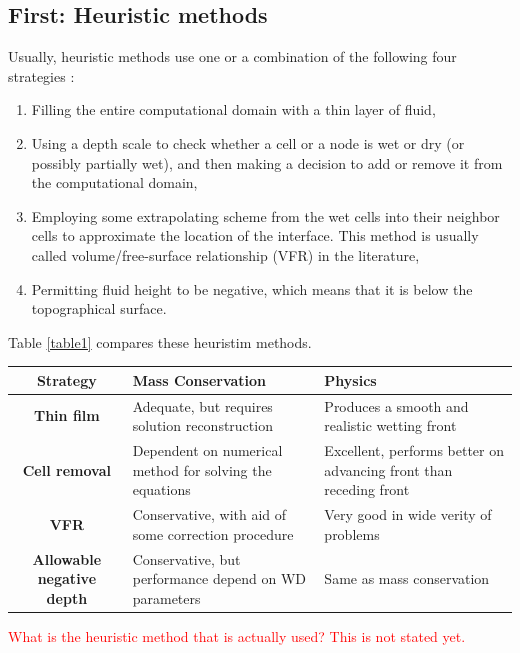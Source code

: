 \documentclass[letterpaper,10pt]{article}
\newcommand{\red}[1]{\textcolor{red}{#1}}
\begin{document}
\subsection{First: Heuristic methods} \label{Heuristic}
Usually, heuristic methods use one or a combination of the following four strategies \cite{Medeiros2013}: 
\begin{enumerate}
        \item Filling the entire computational domain with a thin layer of fluid,
        \item Using a depth scale to check whether a cell or a node is wet or dry 
         (or possibly partially wet), and then  making a decision to add or remove it 
         from the computational domain,
        \item Employing some extrapolating scheme from the wet cells into their neighbor 
         cells to approximate the location of the interface. This method is usually called 
         volume/free-surface relationship (VFR) in the literature,
        \item Permitting fluid height to be negative, which means that it is below the topographical surface.
\end{enumerate}
Table \ref{table1} compares these heuristim methods.
\begin{center}\label{table1}
        \begin{tabular}{|c|p{5cm}|p{5cm}|}
                \hline
                {\bf Strategy}                  & {\bf Mass Conservation}                                          & {\bf Physics} \\
                \hline
                {\bf Thin film}                 & Adequate, but requires solution reconstruction 
                & Produces a smooth and realistic wetting front     \\
                \hline 
                {\bf Cell removal}              & Dependent on numerical method for solving the equations          & Excellent, performs better on advancing front than receding front \\
                \hline
                {\bf VFR}                       & Conservative, with aid of some correction procedure              & Very good in wide verity of problems      \\
                \hline
                {\bf Allowable negative depth}  & Conservative, but performance depend on WD parameters            & Same as mass conservation      \\
                \hline
        \end{tabular}
\end{center}
\red{What is the heuristic method that is actually used? This is not stated yet.}
\end{document}
